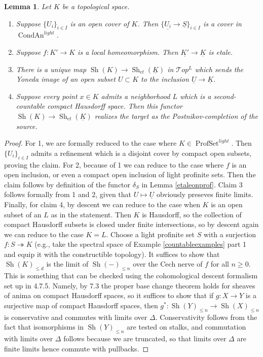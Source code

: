\documentclass[12pt]{article}
\newtheorem{lemma}[theorem]{Lemma}
\newcommand{\on}{\operatorname}
\begin{document}
\begin{lemma}\label{etaleontopological}
Let $K$ be a topological space.
\begin{enumerate}
\item Suppose $\{U_i\}_{i\in I}$ is an open cover of $K$.  Then $\{\underline{U_i}\rightarrow \underline{S}\}_{i\in I}$ is a cover in $\on{CondAn}^{light}$.
\item Suppose $f:K'\rightarrow K$ is a local homeomorphism.  Then $\underline{K'}\rightarrow \underline{K}$ is etale.
\item There is a unique map $\on{Sh}(K)\rightarrow \on{Sh}_{et}(\underline{K})$ in $\mathcal{T}op^L$ which sends the Yoneda image of an open subset $U\subset K$ to the inclusion $\underline{U}\rightarrow \underline{K}$.
\item Suppose every point $x\in K$ admits a neighborhood $L$ which is a second-countable compact Hausdorff space.  Then this functor $\on{Sh}(K)\rightarrow \on{Sh}_{et}(\underline{K})$ realizes the target as the Postnikov-completion of the source.
\end{enumerate}
\end{lemma}
\begin{proof}
For 1, we are formally reduced to the case where $K\in\on{ProfSet}^{light}$.  Then $\{U_i\}_{i\in I}$ admits a refinement which is a disjoint cover by compact open subsets, proving the claim.  For 2, because of 1 we can reduce to the case where $f$ is an open inclusion, or even a compact open inclusion of light profinite sets.  Then the claim follows by definition of the functor $\delta_S$ in Lemma \ref{etaleonprof}.  Claim 3 follows formally from 1 and 2, given that $U\mapsto \underline{U}$ obviously preseves finite limits.  Finally, for claim 4, by descent we can reduce to the case when $K$ is an open subset of an $L$ as in the statement.  Then $K$ is Hausdorff, so the collection of compact Hausdorff subsets is closed under finite intersections, so by descent again we can reduce to the case $K=L$.  Choose a light profinite set $S$ with a surjection $f:S\twoheadrightarrow K$ (e.g., take the spectral space of Example \ref{countableexamples} part 1 and equip it with the constructible topology).  It suffices to show that $\on{Sh}(K)_{\leq d}$ is the limit of $\on{Sh}(-)_{\leq n}$ over the Cech nerve of $f$ for all $n\geq 0$.  This is something that can be checked using the cohomological descent formalism set up in \cite{LurieHA} 4.7.5.  Namely, by \cite{LurieHTT} 7.3 the proper base change theorem holds for sheaves of anima on compact Hausdorff spaces, so it suffices to show that if $g:X\rightarrow Y$ is a surjective map of compact Hausdorff spaces, then $g^\ast:\on{Sh}(Y)_{\leq n}\rightarrow \on{Sh}(X)_{\leq n}$ is conservative and commutes with limits over $\Delta$.  Conservativity follows from the fact that isomorphisms in $\on{Sh}(Y)_{\leq n}$ are tested on stalks, and commutation with limits over $\Delta$ follows because we are truncated, so that limits over $\Delta$ are finite limits hence commute with pullbacks.
\end{proof}
\end{document}
